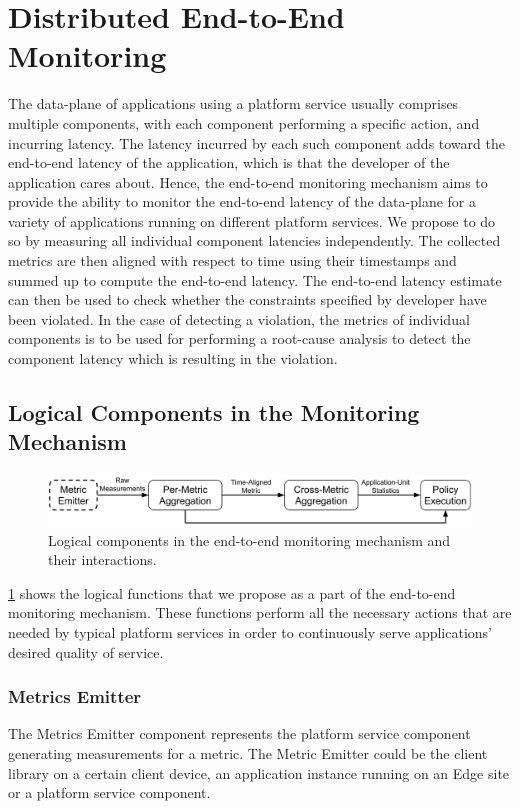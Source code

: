 \section{Distributed End-to-End Monitoring}
The data-plane of applications using a platform service usually comprises multiple components, with each component performing a specific action, and incurring latency. The latency incurred by each such component adds toward the end-to-end latency of the application, which is that the developer of the application cares about. Hence, the end-to-end monitoring mechanism aims to provide the ability to monitor the end-to-end latency of the data-plane for a variety of applications running on different platform services. We propose to do so by measuring all individual component latencies independently. The collected metrics are then aligned with respect to time using their timestamps and summed up to compute the end-to-end latency. The end-to-end latency estimate can then be used to check whether the constraints specified by developer have been violated.  In the case of detecting a violation, the metrics of individual components is to be used for performing a root-cause analysis to detect the component latency which is resulting in the violation.

\subsection{Logical Components in the Monitoring Mechanism}
\label{sec:monitoring_logical}
\begin{figure}
\centering
\includegraphics[width=\linewidth]{figures/design_space/monitoring/functions.pdf}
\caption{Logical components in the end-to-end monitoring mechanism and their interactions.}
\label{fig:monitoring_functions}
\end{figure}
\cref{fig:monitoring_functions} shows the logical functions that we propose as a part of the end-to-end monitoring mechanism. These functions perform all the necessary actions that are needed by typical platform services in order to continuously serve applications' desired quality of service.
\subsubsection{Metrics Emitter}
The Metrics Emitter component represents the platform service component generating measurements for a metric. The Metric Emitter could be the client library on a certain client device, an application instance running on an Edge site or a platform service component. 
